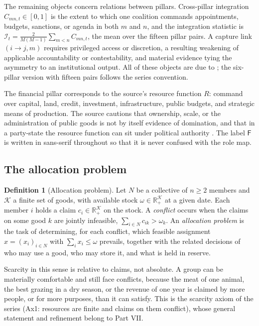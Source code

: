 \documentclass[11pt,letterpaper]{article}
\theoremstyle{definition}
\newtheorem{definition}[theorem]{Definition}
\theoremstyle{remark}
\newcommand{\pF}{\mathsf{F}}
\newcommand{\Integ}{\mathcal{I}}
\begin{document}
The remaining objects concern relations between pillars. Cross-pillar integration $C_{mn,t}\in[0,1]$ is the extent to which one coalition commands appointments, budgets, sanctions, or agenda in both $m$ and $n$, and the integration statistic is $\Integ_t=\tfrac{2}{M(M-1)}\sum_{m<n}C_{mn,t}$, the mean over the fifteen pillar pairs. A capture link $(i\to j,m)$ requires privileged access or discretion, a resulting weakening of applicable accountability or contestability, and material evidence tying the asymmetry to an institutional output. All of these objects are due to \citet{largo2026hbs}; the six-pillar version with fifteen pairs follows the series convention.

The financial pillar corresponds to the source's resource function $R$: command over capital, land, credit, investment, infrastructure, public budgets, and strategic means of production. The source cautions that ownership, scale, or the administration of public goods is not by itself evidence of domination, and that in a party-state the resource function can sit under political authority \citep{largo2026hbs}. The label $\pF$ is written in sans-serif throughout so that it is never confused with the role map.

\subsection{The allocation problem}

\begin{definition}[Allocation problem]
\label{def:financial-power:allocation-problem}
Let $N$ be a collective of $n\geq 2$ members and $\mathcal{K}$ a finite set of goods, with available stock $\omega\in\mathbb{R}^{\mathcal{K}}_{+}$ at a given date. Each member $i$ holds a claim $c_i\in\mathbb{R}^{\mathcal{K}}_{+}$ on the stock. A \emph{conflict} occurs when the claims on some good $k$ are jointly infeasible, $\sum_{i\in N}c_{ik}>\omega_k$. An \emph{allocation problem} is the task of determining, for each conflict, which feasible assignment $x=(x_i)_{i\in N}$ with $\sum_i x_i\leq\omega$ prevails, together with the related decisions of who may use a good, who may store it, and what is held in reserve.
\end{definition}

Scarcity in this sense is relative to claims, not absolute. A group can be materially comfortable and still face conflicts, because the meat of one animal, the best grazing in a dry season, or the revenue of one year is claimed by more people, or for more purposes, than it can satisfy. This is the scarcity axiom of the series (Ax1: resources are finite and claims on them conflict), whose general statement and refinement belong to Part VII.
\end{document}
